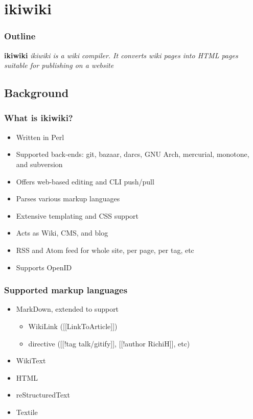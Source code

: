 \documentclass[t]{beamer}
\begin{document}
\section{ikiwiki}

\begin{frame}
	\frametitle{Outline}
	\tableofcontents[currentsection]
\end{frame}

\begin{frame}
		\begin{center}
			\vfill
			\vfill
			\textbf{ikiwiki}
			\vfill
			\textit{ikiwiki is a wiki compiler. It converts wiki pages into HTML pages suitable for publishing on a website}
			\vfill
			\vfill
		\end{center}
\end{frame}

\subsection{Background}

\begin{frame}
	\frametitle{What is ikiwiki?}
	\begin{itemize}
		\item Written in Perl
		\item Supported back-ends: git, bazaar, darcs, GNU Arch, mercurial, monotone, and subversion
		\item Offers web-based editing and CLI push/pull
		\item Parses various markup languages
		\item Extensive templating and CSS support
		\item Acts as Wiki, CMS, and blog
		\item RSS and Atom feed for whole site, per page, per tag, etc
		\item Supports OpenID
	\end{itemize}
\end{frame}

\begin{frame}
	\frametitle{Supported markup languages}
	\begin{itemize}
		\item MarkDown, extended to support
		\begin{itemize}
			\item WikiLink ([[LinkToArticle]])
			\item directive ([[!tag talk/gitify]], [[!author RichiH]], etc)
		\end{itemize}
		\item WikiText
		\item HTML
		\item reStructuredText
		\item Textile
	\end{itemize}
\end{frame}
\end{document}
